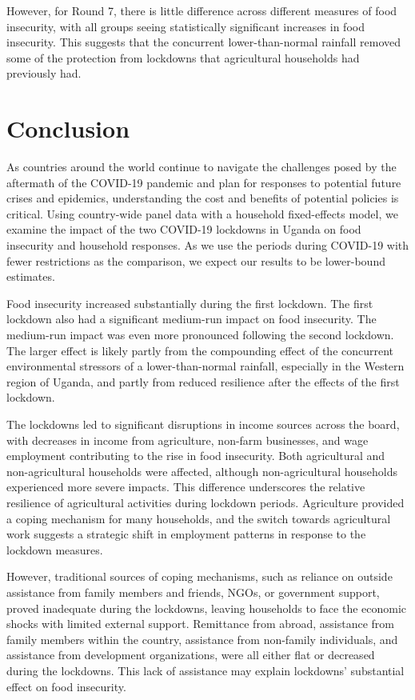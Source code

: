 \documentclass{wber}
\begin{document}
However, for Round 7, there is little difference across different
measures of food insecurity, with all groups seeing statistically
significant increases in food insecurity. This suggests that the
concurrent lower-than-normal rainfall removed some of the protection
from lockdowns that agricultural households had previously had.

\section{Conclusion}\label{conclusion}

As countries around the world continue to navigate the challenges posed
by the aftermath of the COVID-19 pandemic and plan for responses to
potential future crises and epidemics, understanding the cost and
benefits of potential policies is critical. Using country-wide panel
data with a household fixed-effects model, we examine the impact of the
two COVID-19 lockdowns in Uganda on food insecurity and household
responses. As we use the periods during COVID-19 with fewer restrictions
as the comparison, we expect our results to be lower-bound estimates.

Food insecurity increased substantially during the first lockdown. The
first lockdown also had a significant medium-run impact on food
insecurity. The medium-run impact was even more pronounced following the
second lockdown. The larger effect is likely partly from the compounding
effect of the concurrent environmental stressors of a lower-than-normal
rainfall, especially in the Western region of Uganda, and partly from
reduced resilience after the effects of the first lockdown.

The lockdowns led to significant disruptions in income sources across
the board, with decreases in income from agriculture, non-farm
businesses, and wage employment contributing to the rise in food
insecurity. Both agricultural and non-agricultural households were
affected, although non-agricultural households experienced more severe
impacts. This difference underscores the relative resilience of
agricultural activities during lockdown periods. Agriculture provided a
coping mechanism for many households, and the switch towards
agricultural work suggests a strategic shift in employment patterns in
response to the lockdown measures.

However, traditional sources of coping mechanisms, such as reliance on
outside assistance from family members and friends, NGOs, or government
support, proved inadequate during the lockdowns, leaving households to
face the economic shocks with limited external support. Remittance from
abroad, assistance from family members within the country, assistance
from non-family individuals, and assistance from development
organizations, were all either flat or decreased during the lockdowns.
This lack of assistance may explain lockdowns' substantial effect on
food insecurity.
\end{document}
